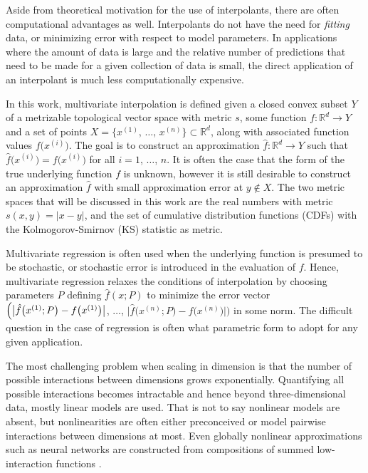 \documentclass[smallextended,final]{svjour3}       %
\begin{document}
Aside from theoretical motivation for the use of interpolants, there
are often computational advantages as well. Interpolants do not have
the need for \textit{fitting} data, or minimizing error with respect
to model parameters. In applications where the amount of data is large
and the relative number of predictions that need to be made for a
given collection of data is small, the direct application of an
interpolant is much less computationally expensive.

In this work, multivariate interpolation is defined given a closed
convex subset $Y$ of a metrizable topological vector space with metric
$s$, some function $f:\mathbb{R}^d \rightarrow Y$ and a set of points
$X = \bigl\{x^{(1)}$, $\ldots$, $x^{(n)}\bigr\} \subset \mathbb{R}^d$,
along with associated function values $f\bigl(x^{(i)}\bigr)$. The goal
is to construct an approximation $\hat f: \mathbb{R}^d \rightarrow Y$
such that $\hat f\bigl(x^{(i)}\bigr) = f\bigl(x^{(i)}\bigr)$ for all
$i = 1$, $\ldots$, $n$. It is often the case that the form of the true
underlying function $f$ is unknown, however it is still desirable to
construct an approximation $\hat f$ with small approximation error at
$y \notin X$. The two metric spaces that will be discussed in this
work are the real numbers with metric $s(x,y) = |x-y|$, and the set of
cumulative distribution functions (CDFs) with the Kolmogorov-Smirnov
(KS) statistic as metric.

Multivariate regression is often used when the underlying function is
presumed to be stochastic, or stochastic error is introduced in the
evaluation of $f$. Hence, multivariate regression relaxes the
conditions of interpolation by choosing parameters $P$ defining $\hat
f(x;P)$ to minimize the error vector $\Bigl( \bigl | \hat f
\bigl(x^{(1)};P\bigr) - f\bigl(x^{(1)}\bigr) \bigr|$, $\ldots$, $\bigl
| \hat f \bigl(x^{(n)}; P\bigr) - f\bigl(x^{(n)}\bigr) \bigr | \Bigr)$
in some norm. The difficult question in the case of regression is
often what parametric form to adopt for any given application.

The most challenging problem when scaling in dimension is that the
number of possible interactions between dimensions grows
exponentially. Quantifying all possible interactions becomes
intractable and hence beyond three-dimensional data, mostly linear
models are used. That is not to say nonlinear models are absent, but
nonlinearities are often either preconceived or model pairwise
interactions between dimensions at most. Even globally nonlinear
approximations such as neural networks are constructed from
compositions of summed low-interaction functions
\cite{clevert2015fast}.
\end{document}
